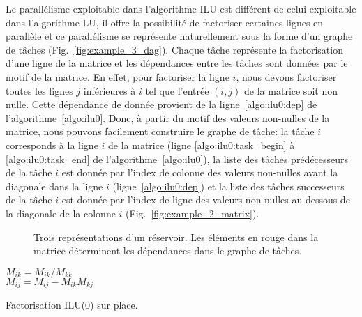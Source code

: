 Le parallélisme exploitable dans l'algorithme ILU est différent de celui exploitable dans l'algorithme LU, il offre la possibilité de factoriser certaines lignes en parallèle et ce parallélisme se représente naturellement sous la forme d'un graphe de tâches (Fig.~\ref{fig:example_3_dag}).
%
Chaque tâche représente la factorisation d'une ligne de la matrice et les dépendances entre les tâches sont données par le motif de la matrice.
%
En effet, pour factoriser la ligne $i$, nous devons factoriser toutes les lignes $j$ inférieures à $i$ tel que l'entrée $(i,j)$ de la matrice soit non nulle.
%
Cette dépendance de donnée provient de la ligne~\ref{algo:ilu0:dep} de l'algorithme~\ref{algo:ilu0}.
%
Donc, à partir du motif des valeurs non-nulles de la matrice, nous pouvons facilement construire le graphe de tâche:
%
la tâche $i$ corresponds à la ligne $i$ de la matrice (ligne \ref{algo:ilu0:task_begin} à \ref{algo:ilu0:task_end} de l'algorithme~\ref{algo:ilu0}), la liste des tâches prédécesseurs de la tâche $i$ est donnée par l'index de colonne des valeurs non-nulles avant la diagonale dans la ligne $i$ (ligne~\ref{algo:ilu0:dep}) et la liste des tâches successeurs de la tâche $i$ est donnée par l'index de ligne des valeurs non-nulles au-dessous de la diagonale de la colonne $i$ (Fig.~\ref{fig:example_2_matrix}).

\begin{figure}[!h]
     \begin{center}
    \end{center}
    \caption{Trois représentations d'un réservoir. Les éléments en rouge dans la matrice déterminent les dépendances dans le graphe de tâches.}
    \label{fig:exemple_3_dag}
\end{figure}

\begin{algorithm}
   {
     { \label{algo:ilu0:task_begin}
      $M_{ik} = M_{ik} / M_{kk}$ \label{algo:ilu0:dep}\\
       {
        $M_{ij} = M_{ij} - M_{ik}M_{kj}$ \\
      }
    } \label{algo:ilu0:task_end}
  }
  \caption{Factorisation ILU(0) sur place.}
  \label{algo:ilu0}
\end{algorithm}


